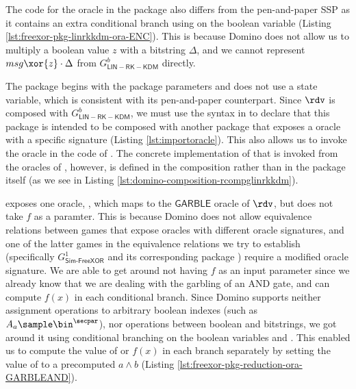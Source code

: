 

The code for the  oracle in the  package also differs from the pen-and-paper SSP as it contains an extra conditional branch using  on the boolean variable  (Listing \ref{lst:freexor-pkg-linrkkdm-ora-ENC}). This is because Domino does not allow us to multiply a boolean value $z$ with a bitstring $\Delta$, and we cannot represent ${msg} \xor {z}\cdot \Delta$ from $G^{b}_{\mathsf{LIN-RK-KDM}}$ directly.

The  package begins with the package parameters and does not use a state variable, which is consistent with its pen-and-paper counterpart. Since $\rdv$ is composed with $G^{b}_{\mathsf{LIN-RK-KDM}}$, we must use the  syntax in  to declare that this package is intended to be composed with another package that exposes a  oracle with a specific signature (Listing \ref{lst:importoracle}). This also allows us to invoke the  oracle in the code of . The concrete implementation of  that is invoked from the oracles of , however, is defined in the composition rather than in the  package itself (as we see in Listing \ref{lst:domino-composition-rcompglinrkkdm}). 



 exposes one oracle, , which maps to the $\mathsf{GARBLE}$ oracle of $\rdv$, but does not take $f$ as a paramter. This is because Domino does not allow equivalence relations between games that expose oracles with different oracle signatures, and one of the latter games in the equivalence relations we try to establish (specifically $G^{1}_\mathsf{Sim\text{-}FreeXOR}$ and its corresponding package ) require a modified oracle signature. We are able to get around not having $f$ as an input parameter since we already know that we are dealing with the garbling of an AND gate, and can compute $f(x)$ in each conditional branch. Since Domino supports neither assignment operations to arbitrary boolean indexes (such as $A_a \sample \bin^\secpar $), nor operations between boolean and bitstrings, we got around it using conditional branching on the boolean variables  and . This enabled us to compute the value of  or $f(x)$ in each branch separately by setting the value of  to a precomputed $a\land b$ (Listing \ref{lst:freexor-pkg-reduction-ora-GARBLEAND}).

